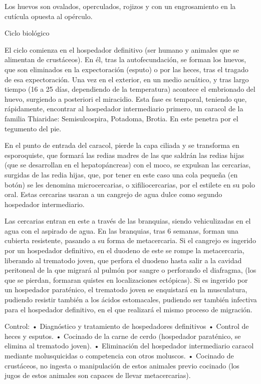 Los huevos son ovalados, operculados, rojizos y con un engrosamiento en la cutícula opuesta al opérculo. 

Ciclo biológico

El ciclo comienza en el hospedador definitivo (ser humano y animales que se alimentan de crustáceos). En él, tras la autofecundación, se forman los huevos, que son eliminados en la expectoración (esputo) o por las heces, tras el tragado de esa expectoración. Una vez en el exterior, en un medio acuático, y tras largo tiempo (16 a 25 días, dependiendo de la temperatura) acontece el embrionado del huevo, surgiendo a posteriori el miracidio. Esta fase es temporal, teniendo que, rápidamente, encontrar al hospedador intermediario primero, un caracol de la familia Thiaridae: Semisulcospira, Potadoma, Brotia. En este penetra por el tegumento del pie.

En el punto de entrada del caracol, pierde la capa ciliada y se transforma en esporoquiste, que formará las redias madres de las que saldrán las redias hijas (que se desarrollan en el hepatopáncreas) con el moco, se expulsan las cercarias, surgidas de las redia hijas, que, por tener en este caso una cola pequeña (en botón) se les denomina microcercarias, o xifiliocercarias, por el estilete en su polo oral. Estas cercarias usaran a un cangrejo de agua dulce como segundo hospedador intermediario.

Las cercarias entran en este a través de las branquias, siendo vehiculizadas en el agua con el aspirado de agua. En las branquias, tras 6 semanas, forman una cubierta resistente, pasando a su forma de metacercaria. Si el cangrejo es ingerido por un hospedador definitivo, en el duodeno de este se rompe la metacercaria, liberando al trematodo joven, que perfora el duodeno hasta salir a la cavidad peritoneal de la que migrará al pulmón por sangre o perforando el diafragma, (los que se pierdan, formaran quistes en localizaciones ectópicas). Si es ingerido por un hospedador paraténico, el trematodo joven se enquistará en la musculatura, pudiendo resistir también a los ácidos estomacales, pudiendo ser también infectiva para el hospedador definitivo, en el que realizará el mismo proceso de migración.

Control:
• Diagnóstico y tratamiento de hospedadores definitivos
• Control de heces y esputos.
• Cocinado de la carne de cerdo (hospedador paraténico, se elimina al trematodo joven).
• Eliminación del hospedador intermediario caracol mediante molusquicidas o competencia con otros moluscos.
• Cocinado de crustáceos, no ingesta o manipulación de estos animales previo cocinado (los jugos de estos animales son capaces de llevar metacercarias).

